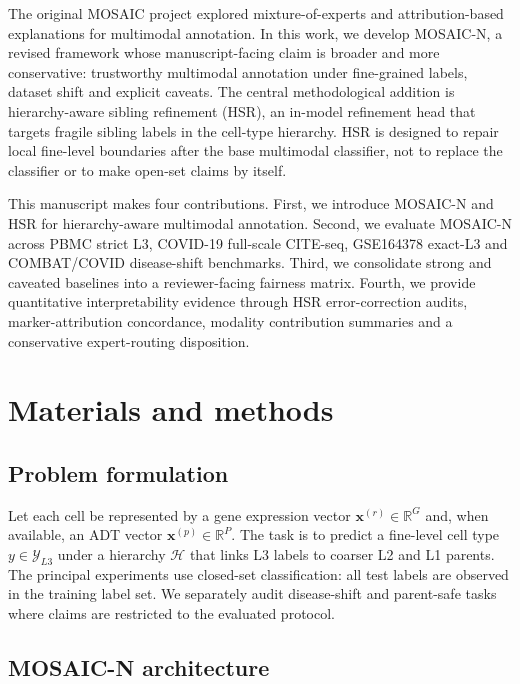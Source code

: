 \documentclass[unnumsec,webpdf,contemporary,large,numbered]{oup-authoring-template}
\begin{document}
The original MOSAIC project explored mixture-of-experts and attribution-based explanations for multimodal annotation. In this work, we develop MOSAIC-N, a revised framework whose manuscript-facing claim is broader and more conservative: trustworthy multimodal annotation under fine-grained labels, dataset shift and explicit caveats. The central methodological addition is hierarchy-aware sibling refinement (HSR), an in-model refinement head that targets fragile sibling labels in the cell-type hierarchy. HSR is designed to repair local fine-level boundaries after the base multimodal classifier, not to replace the classifier or to make open-set claims by itself.

This manuscript makes four contributions. First, we introduce MOSAIC-N and HSR for hierarchy-aware multimodal annotation. Second, we evaluate MOSAIC-N across PBMC strict L3, COVID-19 full-scale CITE-seq, GSE164378 exact-L3 and COMBAT/COVID disease-shift benchmarks. Third, we consolidate strong and caveated baselines into a reviewer-facing fairness matrix. Fourth, we provide quantitative interpretability evidence through HSR error-correction audits, marker-attribution concordance, modality contribution summaries and a conservative expert-routing disposition.

\section{Materials and methods}

\subsection{Problem formulation}

Let each cell be represented by a gene expression vector $\mathbf{x}^{(r)} \in \mathbb{R}^{G}$ and, when available, an ADT vector $\mathbf{x}^{(p)} \in \mathbb{R}^{P}$. The task is to predict a fine-level cell type $y \in \mathcal{Y}_{L3}$ under a hierarchy $\mathcal{H}$ that links L3 labels to coarser L2 and L1 parents. The principal experiments use closed-set classification: all test labels are observed in the training label set. We separately audit disease-shift and parent-safe tasks where claims are restricted to the evaluated protocol.

\subsection{MOSAIC-N architecture}
\end{document}
